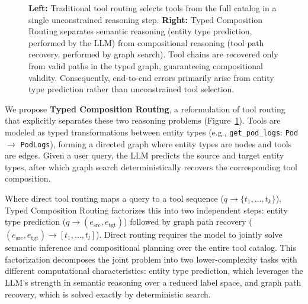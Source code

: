 \begin{figure}[t]

\caption{
\textbf{Left:} Traditional tool routing selects tools from the full catalog in a single unconstrained reasoning step.
\textbf{Right:} Typed Composition Routing separates semantic reasoning (entity type prediction, performed by the LLM) from compositional reasoning (tool path recovery, performed by graph search). Tool chains are recovered only from valid paths in the typed graph, guaranteeing compositional validity. Consequently, end-to-end errors primarily arise from entity type prediction rather than unconstrained tool selection.
}

\label{fig:approach}
\end{figure}

We propose \textbf{Typed Composition Routing}, a reformulation of tool routing that explicitly separates these two reasoning problems (Figure~\ref{fig:approach}). Tools are modeled as typed transformations between entity types (e.g., \texttt{get\_pod\_logs}: \texttt{Pod} $\rightarrow$ \texttt{PodLogs}), forming a directed graph where entity types are nodes and tools are edges. Given a user query, the LLM predicts the source and target entity types, after which graph search deterministically recovers the corresponding tool composition.

Where direct tool routing maps a query to a tool sequence ($q \rightarrow \{t_1, \ldots, t_k\}$), Typed Composition Routing factorizes this into two independent steps: entity type prediction ($q \rightarrow (e_{\mathrm{src}}, e_{\mathrm{tgt}})$) followed by graph path recovery ($(e_{\mathrm{src}}, e_{\mathrm{tgt}}) \rightarrow [t_1, \ldots, t_l]$).
Direct routing requires the model to jointly solve semantic inference and compositional planning over the entire tool catalog.
This factorization decomposes the joint problem into two lower-complexity tasks with different computational characteristics: entity type prediction, which leverages the LLM's strength in semantic reasoning over a reduced label space, and graph path recovery, which is solved exactly by deterministic search.

